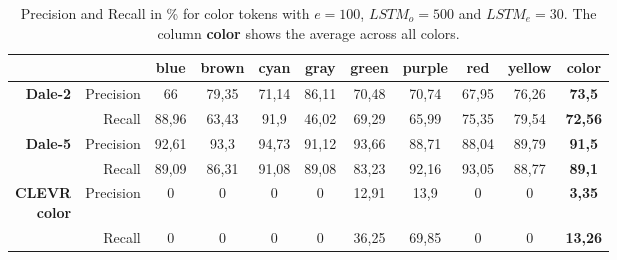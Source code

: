 \begin{table}[ht]
    \centering
    \begin{tabular}{rr|cccccccc|c}
        \toprule
                                         &             & {blue}  & {brown} & {cyan}  & {gray}  & {green} & {purple} & {red}   & {yellow} & \textbf{color}   \\\midrule
        \multirow{2}{*}{\textbf{Dale-2}} & {Precision} & {66}    & {79,35} & {71,14} & {86,11} & {70,48} & {70,74}  & {67,95} & {76,26}  & \textbf{73,5}    \\
                                         & {Recall}    & {88,96} & {63,43} & {91,9}  & {46,02} & {69,29} & {65,99}  & {75,35} & {79,54}  & \textbf{72,56}   \\\midrule
        \multirow{2}{*}{\textbf{Dale-5}} & {Precision} & {92,61} & {93,3}  & {94,73} & {91,12} & {93,66} & {88,71}  & {88,04} & {89,79}  & \textbf{91,5}    \\
                                         & {Recall}    & {89,09} & {86,31} & {91,08} & {89,08} & {83,23} & {92,16}  & {93,05} & {88,77}  & {\textbf{89,1}}  \\\midrule
        \multirowcell{2}[0pt][r]{\textbf{CLEVR}                                                                                                             \\\textbf{color}} & {Precision}           & {0} & {0} & {0} & {0} & {12,91} & {13,9}  & {0} & {0}   & \textbf{3,35} \\
                                         & {Recall}    & {0}     & {0}     & {0}     & {0}     & {36,25} & {69,85}  & {0}     & {0}      & {\textbf{13,26}} \\
        \bottomrule
    \end{tabular}
    \caption{Precision and Recall in \% for color tokens with $e=100$, $LSTM_o=500$ and $LSTM_e=30$. The column \textbf{color} shows the average across all colors.}
    \label{tab:results:bb-re-generator_color}
\end{table}

